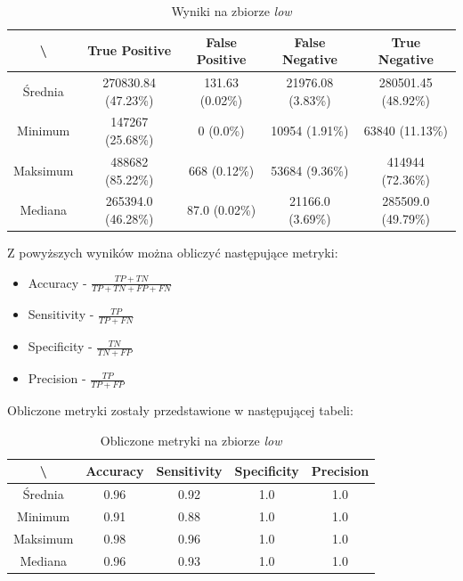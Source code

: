 \begin{table}[!h]
	\centering
	\caption{Wyniki na zbiorze \textit{low}}
	\vspace{6pt}
	{\footnotesize
		\begin{tabular}{|c|c|c|c|c|}
			\hline \textbackslash & True Positive & False Positive & False Negative & True Negative \\
      \hline Średnia & 270830.84 (47.23\%) & 131.63 (0.02\%) & 21976.08 (3.83\%) & 280501.45 (48.92\%) \\
      \hline Minimum & 147267 (25.68\%) & 0 (0.0\%) & 10954 (1.91\%) & 63840 (11.13\%) \\
      \hline Maksimum & 488682 (85.22\%) & 668 (0.12\%) & 53684 (9.36\%) & 414944 (72.36\%) \\
      \hline Mediana & 265394.0 (46.28\%) & 87.0 (0.02\%) & 21166.0 (3.69\%) & 285509.0 (49.79\%) \\
      \hline
		\end{tabular}
	}
	\vspace{0pt}
\end{table}

\vspace{1cm}

Z powyższych wyników można obliczyć następujące metryki:

\begin{itemize}
  \item Accuracy - $ \frac{TP + TN}{TP + TN + FP + FN} $
  \item Sensitivity - $ \frac{TP}{TP + FN} $
  \item Specificity - $ \frac{TN}{TN + FP} $
  \item Precision - $ \frac{TP}{TP + FP} $
\end{itemize}

Obliczone metryki zostały przedstawione w następującej tabeli:

\begin{table}[!h]
	\centering
	\caption{Obliczone metryki na zbiorze \textit{low}}
	\vspace{6pt}
	{\footnotesize
		\begin{tabular}{|c|c|c|c|c|}
			\hline \textbackslash & Accuracy & Sensitivity & Specificity & Precision \\
      \hline Średnia & 0.96 & 0.92 & 1.0 & 1.0 \\
      \hline Minimum & 0.91 & 0.88 & 1.0 & 1.0 \\
      \hline Maksimum & 0.98 & 0.96 & 1.0 & 1.0 \\
      \hline Mediana & 0.96 & 0.93 & 1.0 & 1.0 \\
      \hline
		\end{tabular}
	}
	\vspace{0pt}
\end{table}
